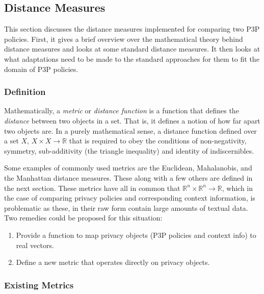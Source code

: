 \subsection{Distance Measures}\label{SimilarityMeasures} %

This section discusses the distance measures implemented for comparing two P3P policies. First, it gives a brief overview over the mathematical theory behind distance measures and looks at some standard distance measures. It then looks at what adaptations need to be made to the standard approaches for them to fit the domain of P3P policies.

\subsubsection{Definition}

Mathematically, a \emph{metric} or \emph{distance function} is a function that defines the \emph{distance} between two objects in a set. That is, it defines a notion of how far apart two objects are. In a purely mathematical sense, a distance function defined over a set $X$, $X\times X\longrightarrow \mathbb{R}$ that is required to obey the conditions of non-negativity, symmetry, sub-additivity (the triangle inequality) and identity of indiscernibles. 

Some examples of commonly used metrics are the Euclidean, Mahalanobis, and the Manhattan distance measures. These along with a few others are defined in the next section. These metrics have all in common that $\mathbb{R}^n\times \mathbb{R}^n\longrightarrow \mathbb{R}$, which in the case of comparing privacy policies and corresponding context information, is problematic as these, in their raw form contain large amounts of textual data. Two remedies could be proposed for this situation:

\begin{enumerate}
\item Provide a function to map privacy objects (P3P policies and context info) to real vectors.
\item Define a new metric that operates directly on privacy objects.
\end{enumerate}

\subsubsection{Existing Metrics}

